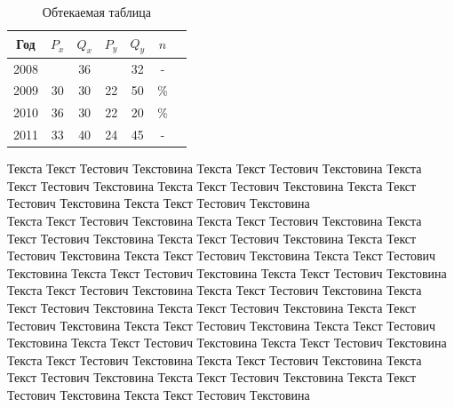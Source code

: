 \documentclass[a4paper,12pt]{article}                       %
\begin{document}
\begin{table}
    \begin{tabular}{|c|c|c|c|c|c|c|}
        \hline
        Год  & $P_x$ & $Q_x$ & $P_y$ & $Q_y$ & $n$ \\ \hline
        2008 &       & 36    &       & 32    & -   \\ \hline
        2009 & 30    & 30    & 22    & 50    & \%  \\ \hline
        2010 & 36    & 30    & 22    & 20    & \%  \\ \hline
        2011 & 33    & 40    & 24    & 45    & -   \\ \hline
    \end{tabular}
    \caption{Обтекаемая таблица}
\end{table}
Текста Текст Тестович Текстовина Текста Текст Тестович Текстовина Текста Текст Тестович Текстовина Текста Текст Тестович Текстовина Текста Текст Тестович Текстовина Текста Текст Тестович Текстовина \\

Текста Текст Тестович Текстовина Текста Текст Тестович Текстовина Текста Текст Тестович Текстовина Текста Текст Тестович Текстовина Текста Текст Тестович Текстовина Текста Текст Тестович Текстовина Текста Текст Тестович Текстовина Текста Текст Тестович Текстовина Текста Текст Тестович Текстовина Текста Текст Тестович Текстовина Текста Текст Тестович Текстовина Текста Текст Тестович Текстовина Текста Текст Тестович Текстовина Текста Текст Тестович Текстовина Текста Текст Тестович Текстовина Текста Текст Тестович Текстовина Текста Текст Тестович Текстовина Текста Текст Тестович Текстовина Текста Текст Тестович Текстовина Текста Текст Тестович Текстовина Текста Текст Тестович Текстовина Текста Текст Тестович Текстовина Текста Текст Тестович Текстовина Текста Текст Тестович Текстовина

\listoffigures
\listoftables
\end{document}
